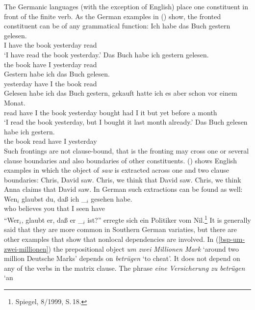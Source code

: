 The Germanic languages (with the exception of English) place one constituent in front of the finite
verb. As the German examples in () show, the fronted constituent can be of any grammatical function:
\eal
\ex 
\gll Ich habe das Buch gestern gelesen.\\
     I have the book yesterday read\\
\glt `I have read the book yesterday.'
\ex 
\gll Das Buch habe ich gestern gelesen.\\
     the book have I yesterday read\\
\ex 
\gll Gestern habe ich das Buch gelesen.\\
     yesterday have I the book read\\
\ex 
\gll Gelesen habe ich das Buch gestern, gekauft hatte ich es aber schon vor einem Monat.\\
     read have I the book yesterday bought had I it but yet before a month\\
\glt `I read the book yesterday, but I bought it last month already.'
\ex 
\gll Das Buch gelesen habe ich gestern.\\
     the book read    have I yesterday\\
\zl
Such frontings are not clause-bound, that is the fronting may cross one or several clause boundaries
and also boundaries of other constituents. () shows English examples in which the object of
\emph{saw} is extracted across one and two clause boundaries:
\eal
\ex\label{ex-chris-we-saw} Chris, David saw.
\ex\label{ex-chris-we-think-that-david-saw} Chris, we think that David saw.
\ex Chris, we think Anna claims that David saw.
\zl
In German such extractions can be found as well:
\eal
\label{ex-fernabhaengigkeit-one}
\ex
\label{ex-wen-glaubst-du-dass}
\gll Wen$_i$ glaubst du, daß ich \_$_i$ gesehen habe.\footnotemark\\
     who believes you that I {} seen have\\
\ex "`Wer$_i$, glaubt er, daß er \_$_i$ ist?"' erregte sich ein Politiker vom Nil.\footnote{
        Spiegel, 8/1999, S.\,18.
}
\zl
It is generally said that they are more common in Southern German variaties, but there are other
examples that show that nonlocal dependencies are involved. In (\ref{bsp-um-zwei-millionen}) the
prepositional object \emph{um zwei Millionen Mark} `around two million Deutsche Marks' depends on
\emph{betrügen} `to cheat'. It does not
depend on any of the verbs in the matrix clause. The phrase \emph{eine Versicherung zu betrügen} `an
